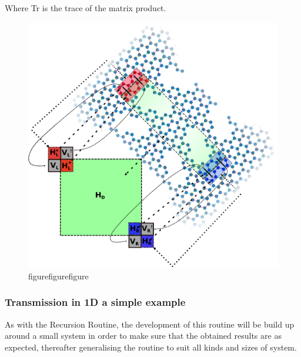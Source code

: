 Where Tr is the trace of the matrix product. 
\begin{figure}
    \centering
    \includegraphics[width=\textwidth]{Listings/illu.eps}
    \caption{figurefigurefigure}
    \label{systemillu}
\end{figure}
\subsubsection{Transmission in 1D a simple example}
As with the Recursion Routine, the development of this routine will be build up around a small system in order to make sure that the obtained results are as expected, thereafter generalising the routine to suit all kinds and sizes of system.

